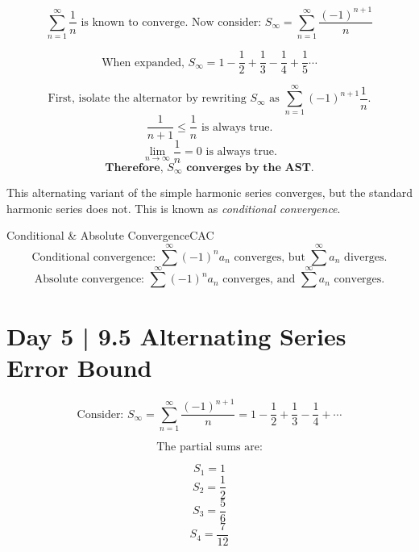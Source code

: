 \documentclass[10pt]{article}
\theoremstyle{definition}
\begin{document}
\[\sum_{n=1}^{\infty} \frac{1}{n} \text{ is known to converge. Now consider: } S_\infty=\sum_{n=1}^{\infty} \frac{(-1)^{n+1}}{n}\]

\[\text{When expanded, } S_\infty=1-\frac{1}{2}+\frac{1}{3}-\frac{1}{4}+\frac{1}{5} \cdots \]

\[\text{First, isolate the alternator by rewriting $S_\infty$ as } \sum_{n=1}^{\infty} (-1)^{n+1}\frac{1}{n}.\]
\[\frac{1}{n+1} \le \frac{1}{n} \text{ is always true.}\]
\[\lim_{n \to \infty} \frac{1}{n}=0 \text{ is always true.}\]
\[\textbf{Therefore, $S_\infty$ converges by the AST.}\]

\vspace{0.5cm}

This alternating variant of the simple harmonic series converges, but the standard harmonic series does not. This is known as \emph{conditional convergence}.

\begin{definition}{Conditional \& Absolute Convergence}{CAC}
\vspace{-0.5cm}
    \[\text{Conditional convergence: } \sum^{\infty} (-1)^n a_n \text{ converges, but } \sum^{\infty} a_n \text{ diverges.}\]
\vspace{-0.5cm}
    \[\text{Absolute convergence: } \sum^{\infty} (-1)^n a_n \text{ converges, and } \sum^{\infty} a_n \text{ converges.}\]
\end{definition}



\section{Day 5 | 9.5 Alternating Series Error Bound}

\vspace{0.5cm}

\[\text{Consider: } S_\infty = \sum_{n=1}^{\infty} \frac{(-1)^{n+1}}{n}=1-\frac{1}{2}+\frac{1}{3}-\frac{1}{4}+\cdots\]


\[\text{The partial sums are:}\]

\[S_1=1\]
\[S_2=\frac{1}{2}\]
\[S_3=\frac{5}{6}\]
\[S_4=\frac{7}{12}\]
\end{document}
